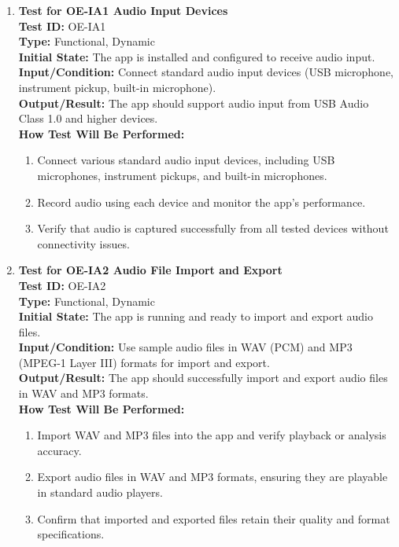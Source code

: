 \documentclass[12pt, titlepage]{article}
\begin{document}
\begin{enumerate}
    \item \textbf{Test for OE-IA1 Audio Input Devices} \\
      \newline
      \textbf{Test ID:} OE-IA1 \\
      \textbf{Type:} Functional, Dynamic \\
      \textbf{Initial State:} The app is installed and configured to receive audio input. \\
      \textbf{Input/Condition:} Connect standard audio input devices (USB microphone, instrument pickup, built-in microphone). \\
      \textbf{Output/Result:} The app should support audio input from USB Audio Class 1.0 and higher devices. \\
      \textbf{How Test Will Be Performed:}
      \begin{enumerate}
          \item Connect various standard audio input devices, including USB microphones, instrument pickups, and built-in microphones.
          \item Record audio using each device and monitor the app’s performance.
          \item Verify that audio is captured successfully from all tested devices without connectivity issues.
      \end{enumerate}

    \item \textbf{Test for OE-IA2 Audio File Import and Export} \\
      \newline
      \textbf{Test ID:} OE-IA2 \\
      \textbf{Type:} Functional, Dynamic \\
      \textbf{Initial State:} The app is running and ready to import and export audio files. \\
      \textbf{Input/Condition:} Use sample audio files in WAV (PCM) and MP3 (MPEG-1 Layer III) formats for import and export. \\
      \textbf{Output/Result:} The app should successfully import and export audio files in WAV and MP3 formats. \\
      \textbf{How Test Will Be Performed:}
      \begin{enumerate}
          \item Import WAV and MP3 files into the app and verify playback or analysis accuracy.
          \item Export audio files in WAV and MP3 formats, ensuring they are playable in standard audio players.
          \item Confirm that imported and exported files retain their quality and format specifications.
      \end{enumerate}


\end{enumerate}
\end{document}

